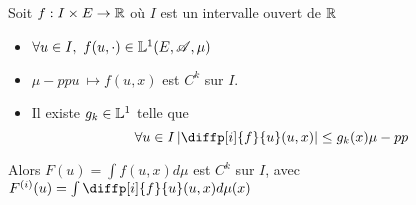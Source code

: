 \begin{theorem}
	Soit $f: I \times E \to \mathbb{R}$ où $I$ est un intervalle ouvert de $\mathbb{R}$\\

	\begin{itemize}
		\item $\forall u \in I, \ f(u,\cdot) \in \mathbb{L}^1(E,\mathscr{A},\mu)$
		\item $\mu-pp u \ \mapsto f(u,x)$ est $C^k$ sur $I$.
		\item Il existe $g_k\in \mathbb{L}^1$ telle que
		      $$ \forall u\in I \left|\diffp[i]{f}{u}(u,x)\right| \leq g_k(x) \mu-pp$$
	\end{itemize}

	Alors $F(u) = \int f(u,x)d\mu$ est $C^k$ sur $I$, avec $F^{(i)}(u) = \int \diffp[i]{f}{u}(u,x)d\mu(x)$

\end{theorem}
